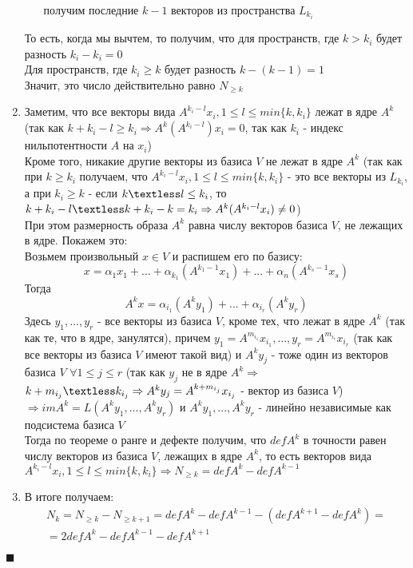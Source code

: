 \documentclass[a4paper,12pt,titlepage,final]{article}
\begin{document}
\begin{enumerate}
\begin{itemize}
        получим последние $k - 1$ векторов из пространства $L_{k_i}$
    \end{itemize}
    То есть, когда мы вычтем, то получим, что для пространств, где $k > k_i$ будет разность $k_i - k_i = 0$ \\
    Для пространств, где $k_i \geq k$ будет разность $k - (k - 1) = 1$ \\
    Значит, это число действительно равно $N_{\geq k}$
    \item Заметим, что все векторы вида $A^{k_i - l}x_i, 1 \leq l \leq min\{k, k_i\}$ лежат в ядре $A^k$ (так как 
    $k + k_i - l \geq k_i \Rightarrow A^k (A^{k_i - l})x_i = 0$, так как $k_i$ - индекс нильпотентности $A$ на $x_i$) \\
    Кроме того, никакие другие векторы из базиса $V$ не лежат в ядре $A^k$ (так как при $k \ge k_i$ получаем, что $A^{k_i - l}x_i, 1 \leq l \leq min\{k, k_i\}$
     - это все векторы из $L_{k_i}$, а при $k_i \geq k$ - если $k \textless l \leq k_i$, то $k + k_i - l \textless 
     k + k_i - k = k_i \Rightarrow A^k(A^{k_i - l}x_i) \neq 0$) \\
    При этом размерность образа $A^k$ равна числу векторов базиса $V$, не лежащих в ядре. Покажем это: \\
    Возьмем произвольный $x \in V$ и распишем его по базису: \\
    $$x = \alpha_1 x_1 + ... + \alpha_{k_1}(A^{k_1 - 1}x_1) + ... + \alpha_n (A^{k_s - 1}x_s)$$
    Тогда $$A^k x = \alpha_{i_1}(A^k y_1) + ... + \alpha_{i_r}(A^k y_r)$$
    Здесь $y_1, ... , y_r$ - все векторы из базиса $V$, кроме тех, что лежат в ядре $A^k$ (так как те, что в ядре, занулятся), причем 
    $y_1 = A^{m_{i_1}}x_{i_1}, ... , y_r = A^{m_{i_r}}x_{i_r}$ (так как все векторы из базиса $V$ имеют такой вид) 
    и $A^k y_j$ - тоже один из векторов базиса $V$ $\forall 1 \leq j \leq r$ (так как $y_j$ не в ядре $A^k \Rightarrow$ 
    $k + m_{i_j} \textless k_{i_j} \Rightarrow A^k y_j = A^{k + m_{i_j}}x_{i_j}$ - вектор из базиса $V$) $\Rightarrow imA^k = L(A^k y_1, ... , A^k y_r)$ и $A^k y_1, ... , A^k y_r$ - линейно независимые как подсистема базиса $V$ \\
    Тогда по теореме о ранге и дефекте получим, что $defA^k$ в точности равен числу векторов из базиса $V$, лежащих в ядре $A^k$, то есть векторов вида $A^{k_i - l}x_i, 1 \leq l \leq min\{k, k_i\} \Rightarrow N_{\geq k} = defA^k - defA^{k - 1}$
    \item В итоге получаем:
    \begin{gather*}
        N_k = N_{\geq k} - N_{\geq k + 1} = defA^k - defA^{k - 1} - (defA^{k + 1} - defA^k) = \\
        = 2defA^k - defA^{k - 1} - defA^{k + 1}
    \end{gather*}
\end{enumerate}
$\blacksquare$ \\ \\ \\
\end{document}

